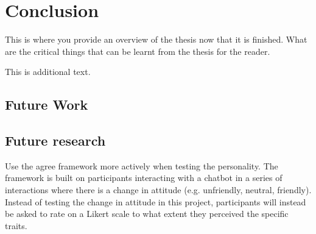 \chapter{Conclusion}
\label{chap:conclusion}

This is where you provide an overview of the thesis now that it is finished.  What are the critical things that can be learnt from the thesis for the reader.

This is additional text.

\section{Future Work}
\label{sec:future}
\section{Future research}

Use the agree framework more actively when testing the personality. The framework is built on participants interacting with a chatbot in a series of interactions where there is a change in attitude (e.g. unfriendly, neutral, friendly). Instead of testing the change in attitude in this project, participants will instead be asked to rate on a Likert scale to what extent they perceived the specific traits.